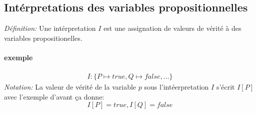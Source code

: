 \documentclass[12pt]{article}
\begin{document}
\subsection*{Intérpretations des variables propositionnelles}

\emph{Définition: } Une intérpretation $I$ est une assignation de valeurs
de vérité à des variables propositionelles.

\paragraph*{exemple}
\begin{align*}
    I: \{ P \mapsto true, Q \mapsto false,\dots \} 
\end{align*}
\emph{Notation: }La valeur de vérité de la variable $p$ sous l'intéerpretation $I$
s'écrit $I[P]$ avec l'exemple d'avant ça donne:
\[
    I[P] = true, I[Q] = false
\]
\end{document}

